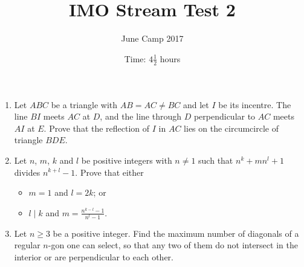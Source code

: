 \documentclass{article}
\title{IMO Stream Test 2}
\author{June Camp 2017}
\date{Time: $4\frac{1}{2}$ hours}
\begin{document}
 \maketitle

\begin{enumerate}

\item %
	Let $ABC$ be a triangle with $AB = AC \neq BC$ and let $I$ be its incentre. The line $BI$ meets $AC$ at $D$, and the line through $D$ perpendicular to $AC$ meets $AI$ at $E$. Prove that the reflection of $I$ in $AC$ lies on the circumcircle of triangle $BDE$.

\item %
	Let $n$, $m$, $k$ and $l$ be positive integers with $n \neq 1$ such that $n^k +m n^l +1$ divides $n^{k+l}-1$. Prove that either
	\begin{itemize}
		\item $m = 1$ and $l = 2k$; or
		\item $l \mid k$ and $m = \frac{n^{k-l}-1}{n^l-1}$.
	\end{itemize}

\item %
	Let $n \geq 3$ be a positive integer. Find the maximum number of diagonals of a regular $n$-gon one can select, so that any two of them do not intersect in the interior or are perpendicular to each other.

\end{enumerate}
\end{document}
